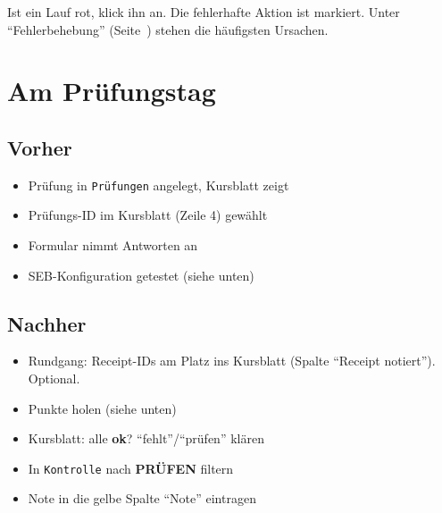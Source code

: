 \documentclass[11pt,a4paper,parskip=half]{scrartcl}
\newcommand{\feld}[1]{\texttt{\color{violett}#1}}
\begin{document}
Ist ein Lauf rot, klick ihn an. Die fehlerhafte Aktion ist markiert. Unter
\enquote{Fehlerbehebung} (Seite~\pageref{fehler}) stehen die häufigsten Ursachen.

\section{Am Prüfungstag}

\begin{minipage}[t]{0.48\linewidth}
\subsection*{Vorher}
\begin{itemize}
  \item[$\square$] Prüfung in \feld{Prüfungen} angelegt, Kursblatt zeigt 
  \item[$\square$] Prüfungs-ID im Kursblatt (Zeile 4) gewählt
  \item[$\square$] Formular nimmt Antworten an
  \item[$\square$] SEB-Konfiguration getestet (siehe unten)
\end{itemize}
\end{minipage}\hfill
\begin{minipage}[t]{0.48\linewidth}
\subsection*{Nachher}
\begin{itemize}
  \item[$\square$] Rundgang: Receipt-IDs am Platz ins Kursblatt
        (Spalte \enquote{Receipt notiert}). Optional.
  \item[$\square$] Punkte holen (siehe unten)
  \item[$\square$] Kursblatt: alle \textbf{ok}? \enquote{fehlt}/\enquote{prüfen} klären
  \item[$\square$] In \feld{Kontrolle} nach \textbf{PRÜFEN} filtern
  \item[$\square$] Note in die gelbe Spalte \enquote{Note} eintragen
\end{itemize}
\end{minipage}
\end{document}
